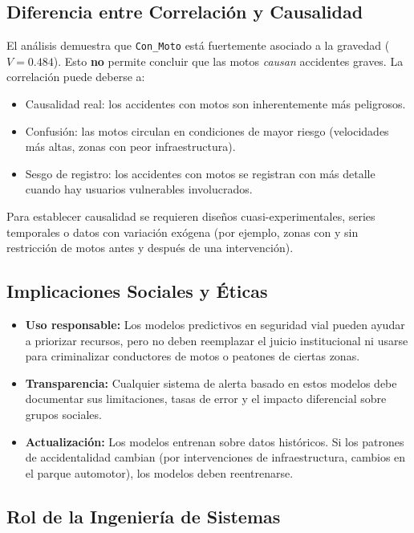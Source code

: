 \documentclass[11pt,a4paper]{article}
\begin{document}
\subsection{Diferencia entre Correlación y Causalidad}

El análisis demuestra que \texttt{Con\_Moto} está fuertemente asociado a la gravedad
($V = 0.484$). Esto \textbf{no} permite concluir que las motos \textit{causan} accidentes
graves. La correlación puede deberse a:

\begin{itemize}
  \item Causalidad real: los accidentes con motos son inherentemente más peligrosos.
  \item Confusión: las motos circulan en condiciones de mayor riesgo (velocidades más
        altas, zonas con peor infraestructura).
  \item Sesgo de registro: los accidentes con motos se registran con más detalle cuando
        hay usuarios vulnerables involucrados.
\end{itemize}

Para establecer causalidad se requieren diseños cuasi-experimentales, series temporales o
datos con variación exógena (por ejemplo, zonas con y sin restricción de motos antes y
después de una intervención).

\subsection{Implicaciones Sociales y Éticas}

\begin{itemize}
  \item \textbf{Uso responsable:} Los modelos predictivos en seguridad vial pueden ayudar
        a priorizar recursos, pero no deben reemplazar el juicio institucional ni usarse
        para criminalizar conductores de motos o peatones de ciertas zonas.
  \item \textbf{Transparencia:} Cualquier sistema de alerta basado en estos modelos debe
        documentar sus limitaciones, tasas de error y el impacto diferencial sobre grupos
        sociales.
  \item \textbf{Actualización:} Los modelos entrenan sobre datos históricos. Si los
        patrones de accidentalidad cambian (por intervenciones de infraestructura,
        cambios en el parque automotor), los modelos deben reentrenarse.
\end{itemize}

\subsection{Rol de la Ingeniería de Sistemas}
\end{document}
